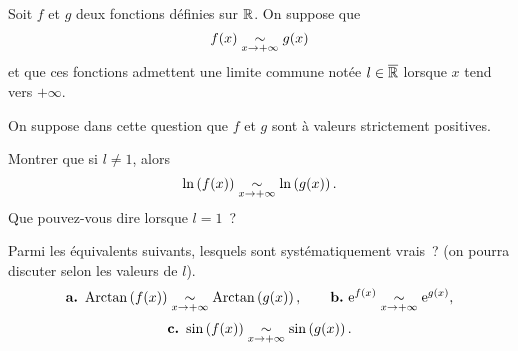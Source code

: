 \documentclass{magnolia}
\begin{document}




Soit $f$ et $g$ deux fonctions définies sur $\mathbb{R}$. On suppose que
\[f(x)\underset{x\rightarrow +\infty}{\sim}g(x)\]
et que ces fonctions admettent une limite commune notée $l\in\overline{\mathbb{R}}$ lorsque
$x$ tend vers $+\infty$.
\begin{questions}
\question On suppose dans cette question que $f$ et $g$ sont à valeurs
  strictement positives.
  \begin{questions}
  \question Montrer que si $l\neq 1$, alors
    \[\ln\left(f(x)\right)\underset{x\rightarrow +\infty}{\sim}\ln\left(g(x)\right).\]
  \question Que pouvez-vous dire lorsque $l=1$~?
  \end{questions}
\question Parmi les équivalents suivants, lesquels sont systématiquement vrais~?
  (on pourra discuter selon les valeurs de $l$).
  \[\textbf{a.}\ \arctan\p{f(x)}\equi{x}{+\infty}\arctan\p{g(x)}, \qquad 
  \textbf{b.}\ \e^{f(x)}\equi{x}{+\infty} \e^{g(x)},\]
  \[\textbf{c.}\ \sin\p{f(x)}\equi{x}{+\infty}\sin\p{g(x)}.\]
  
\end{questions}
\end{document}
